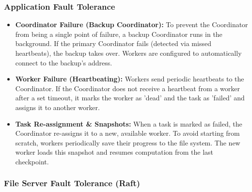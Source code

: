 \documentclass[11pt, a4paper]{article}
\begin{document}
\subsubsection*{Application Fault Tolerance}
\begin{itemize}
    \item \textbf{Coordinator Failure (Backup Coordinator):} To prevent the Coordinator from being
          a single point of failure, a backup Coordinator runs in the background.
          If the primary Coordinator fails (detected via missed heartbeats), the backup takes over.
          Workers are configured to automatically connect to the backup's address.

    \item \textbf{Worker Failure (Heartbeating):} Workers send periodic heartbeats to the Coordinator.
          If the Coordinator does not receive a heartbeat from a worker after a set timeout,
          it marks the worker as 'dead' and the task as 'failed' and assigns it to another worker.

    \item \textbf{Task Re-assignment \& Snapshots:} When a task is marked as failed,
          the Coordinator re-assigns it to a new, available worker.
          To avoid starting from scratch, workers periodically save their progress
          to the file system. The new worker loads this snapshot and resumes computation
          from the last checkpoint.
\end{itemize}

\newpage

\subsubsection*{File Server Fault Tolerance (Raft)}
\end{document}
